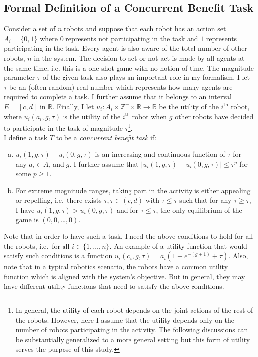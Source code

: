 \documentclass[defaultstyle,12pt]{thesis}
\newcommand{\Z}{\mathbb{Z}}    %
\newcommand{\R}{\mathbb{R}}    %
\begin{document}
\subsection{Formal Definition of a Concurrent Benefit Task}\label{subsec:conbenefitdef}
Consider a set of $n$ robots and suppose that each robot has an action set $A_i=\{0,1\}$ where $0$ represents not participating in the task and $1$ represents participating in the task. Every agent is also aware of the total number of other robots, $n$ in the system. The decision to act or not act is made by all agents at the same time, i.e. this is a one-shot game with no notion of time. The magnitude parameter $\tau$ of the given task also plays an important role in my formalism. I let $\tau$ be an (often random) real number which represents how many agents are required to complete a task. I further assume that it belongs to an interval $E=[c,d]$ in $\R$.  Finally, I let $u_i:A_i\times\Z^+\times \R\to \R$ be the utility of the $i^{\text{th}}$ robot, where $u_i(a_i,g,\tau)$ is the utility of the $i^{\text{th}}$ robot when $g$ other robots have decided to participate in the task of magnitude $\tau$\footnote{In general, the utility of each robot depends on the joint actions of the rest of the robots. However, here I assume that the utility depends only on the number of robots participating in the activity. The following discussions can be substantially generalized to a more general setting but this form of utility serves the purpose of this study.}.\\
I define a task $T$ to be a \emph{concurrent benefit task} if:
\begin{enumerate}[a.]
	\item $u_i(1,g,\tau)-u_i(0,g,\tau)$ is an increasing and continuous function of $\tau$ for any $a_i\in A_i$ and $g$. I further assume that $|u_i(1,g,\tau)-u_i(0,g,\tau)|\leq \tau^p$ for some $p\geq 1$. 
	\item For extreme magnitude ranges, taking part in the activity is either appealing or repelling, i.e.\ there exists $\underline{\tau},\bar{\tau}\in (c,d)$ with $\underline{\tau}\leq \bar{\tau}$ such that for any $\tau\geq \bar{\tau}$, I have $u_i(1,g,\tau)>u_i(0,g,\tau)$ and for $\tau\leq \underline{\tau}$, the only equilibrium of the game is $(0,0,\ldots,0)$. 
\end{enumerate}

Note that in order to have such a task, I need the above conditions to hold for all the robots, i.e.\ for all $i\in\{1,\ldots,n\}$.
An example of a utility function that would satisfy such conditions is a function $u_i(a_i,g,\tau)=a_i(1-e^{-(g+1)}+\tau)$. Also, note that in a typical robotics scenario, the robots have a common utility function which is aligned with the system's objective. But in general, they may have different utility functions that need to satisfy the above conditions. 
\end{document}
